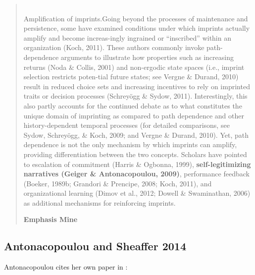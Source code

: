 \begin{quote}
\\
Amplification of imprints.Going beyond the processes of maintenance and persistence, some have examined conditions under which imprints actually amplify and become increas-ingly ingrained or “inscribed” within an organization (Koch, 2011). These authors commonly invoke  path-dependence  arguments  to  illustrate  how  properties  such  as  increasing  returns  (Noda \& Collis, 2001) and non-ergodic state spaces (i.e., imprint selection restricts poten-tial future states; see Vergne \& Durand, 2010) result in reduced choice sets and increasing incentives  to  rely  on  imprinted  traits  or  decision  processes  (Schreyögg  \&  Sydow,  2011).  Interestingly,  this  also  partly  accounts  for  the  continued  debate  as  to  what  constitutes  the  unique domain of imprinting as compared to path dependence and other history-dependent temporal  processes  (for  detailed  comparisons,  see  Sydow,  Schreyögg,  \&  Koch,  2009;  and  Vergne \& Durand, 2010). Yet, path dependence is not the only mechanism by which imprints can  amplify,  providing  differentiation  between  the  two  concepts.  Scholars  have  pointed  to  escalation of commitment (Harris \& Ogbonna, 1999), {\bf self-legitimizing narratives (Geiger \& Antonacopoulou, 2009)}, performance feedback (Boeker, 1989b; Grandori \& Prencipe, 2008; Koch,  2011),  and  organizational  learning  (Dimov  et  al.,  2012;  Dowell  \&  Swaminathan,  2006) as additional mechanisms for reinforcing imprints.\\
\begin{flushright}
{\bf Emphasis Mine}
\end{flushright}
\end{quote}

\subsection{Antonacopoulou and Sheaffer 2014}

Antonacopoulou cites her own paper in \cite{antonacopoulou2014learning}:\\

